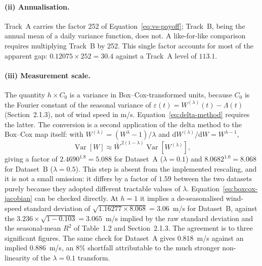 \documentclass[11pt, a4paper, twoside]{article}
\begin{document}
\paragraph{(ii) Annualisation.} Track~A carries the factor 252 of Equation~\eqref{eq:vs-payoff}; Track~B, being the annual mean of a daily variance function, does not. A like-for-like comparison requires multiplying Track~B by 252. This single factor accounts for most of the apparent gap: $0.12075 \times 252 = 30.4$ against a Track~A level of $113.1$.

\paragraph{(iii) Measurement scale.} The quantity $h \times C_0$ is a variance in Box--Cox-transformed units, because $C_0$ is the Fourier constant of the seasonal variance of $\varepsilon(t) = W^{(\lambda)}(t) - \Lambda(t)$ (Section~2.1.3), not of wind speed in m/s. Equation~\eqref{eq:delta-method} requires the latter. The conversion is a second application of the delta method to the Box--Cox map itself: with $W^{(\lambda)} = (W^\lambda - 1)/\lambda$ and $\mathrm{d}W^{(\lambda)}/\mathrm{d}W = W^{\lambda-1}$,
\begin{equation}
\operatorname{Var}[W] \approx \bar W^{\,2(1-\lambda)}\operatorname{Var}\!\left[W^{(\lambda)}\right],
\label{eq:boxcox-jacobian}
\end{equation}
giving a factor of $2.4690^{1.8} = 5.088$ for Dataset~A ($\lambda = 0.1$) and $8.0682^{1.0} = 8.068$ for Dataset~B ($\lambda = 0.5$). This step is absent from the implemented rescaling, and it is not a small omission: it differs by a factor of $1.59$ between the two datasets purely because they adopted different tractable values of $\lambda$. Equation~\eqref{eq:boxcox-jacobian} can be checked directly. At $h = 1$ it implies a de-seasonalised wind-speed standard deviation of $\sqrt{1.16277 \times 8.068} = 3.06$~m/s for Dataset~B, against the $3.236 \times \sqrt{1 - 0.103} = 3.065$~m/s implied by the raw standard deviation and the seasonal-mean $R^2$ of Table~1.2 and Section~2.1.3. The agreement is to three significant figures. The same check for Dataset~A gives $0.818$~m/s against an implied $0.886$~m/s, an 8\% shortfall attributable to the much stronger non-linearity of the $\lambda = 0.1$ transform.
\end{document}

